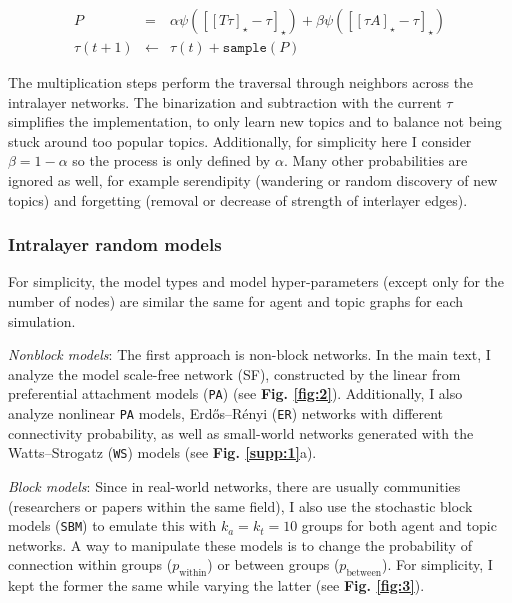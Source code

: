 \documentclass{svproc}
\begin{document}
\vspace{-1em}
\begin{eqnarray}
    P &=&
    \alpha \psi\left(\left[\left[T\tau\right]_{\star} - \tau \right]_{\star}\right) +
    \beta \psi\left(\left[\left[\tau A\right]_{\star} - \tau \right]_{\star}\right)
    \label{eq:1}
    \\
    \tau(t+1) &\leftarrow& \tau(t) + \texttt{sample}(P)
    \label{eq:2}
\end{eqnarray}

The multiplication steps perform the traversal through neighbors across the intralayer networks. The binarization and subtraction with the current $\tau$ simplifies the implementation, to only learn new topics and to balance not being stuck around too popular topics. Additionally, for simplicity here I consider $\beta = 1 - \alpha$ so the process is only defined by $\alpha$. Many other probabilities are ignored as well, for example serendipity (wandering or random discovery of new topics) and forgetting (removal or decrease of strength of interlayer edges).

\vspace{-1em}
\subsubsection*{Intralayer random models}

For simplicity, the model types and model hyper-parameters (except only for the number of nodes) are similar the same for agent and topic graphs for each simulation.

\textit{Nonblock models}: The first approach is non-block networks. In the main text, I analyze the model scale-free network (SF), constructed by the linear from preferential attachment models (\texttt{PA}) \cite{Barabasi1999-dw} (see \textbf{Fig. \ref{fig:2}}). Additionally, I also analyze nonlinear \texttt{PA} models, Erdős–Rényi (\texttt{ER}) networks \cite{Erdos1959-dj} with different connectivity probability, as well as small-world networks generated with the Watts–Strogatz (\texttt{WS}) models \cite{Watts1998-vh} (see \textbf{Fig. \ref{supp:1}}a).

\textit{Block models}: Since in real-world networks, there are usually communities (researchers or papers within the same field), I also use the stochastic block models (\texttt{SBM}) \cite{Faust1992-xo} to emulate this with $k_a = k_t = 10$ groups for both agent and topic networks. A way to manipulate these models is to change the probability of connection within groups ($p_{\mathrm{within}}$) or between groups ($p_{\mathrm{between}}$). For simplicity, I kept the former the same while varying the latter (see \textbf{Fig. \ref{fig:3}}).
\end{document}
